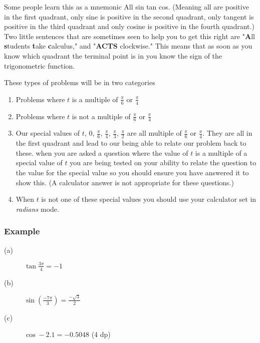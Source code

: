 Some people learn this as a mnemonic All sin tan cos. (Meaning all are positive in the first quadrant, only sine is positive in the second quadrant,
only tangent is positive in the third quadrant and only cosine is positive in the fourth quadrant.) Two little
sentences that are sometimes seen to help you to get this right are "\textbf{A}ll \textbf{s}tudents \textbf{t}ake \textbf{c}alculus," and
"\textbf{ACTS} clockwise." This means that as soon as you know which quadrant the terminal point is in you know the sign of the trigonometric function.


These types of problems will be in two categories 


\begin{enumerate}
	\item Problems where $t$ is a multiple of $\frac{\pi }{6}$ or $\frac{\pi }{4}$ 
	
	\item Problems where $t$ is not a multiple of $\frac{\pi }{6}$ or $\frac{\pi }{4}$ 
	
	\item Our special values of $t$, $0$, $\frac{\pi }{6}$, $\frac{\pi }{4}$, $\frac{\pi }{3}$, $\frac{\pi }{2}$ are all multiple of $\frac{\pi }{6}$ or $\frac{\pi }{4}$. They are all in the first quadrant and lead to our being able to relate our problem back
	to these. when you are asked a question where the value of $t$ is a multiple of a special value of $t$ you are being tested on your ability to relate the question to the value for the special value so you should ensure you have
	answered it to show this. (A calculator answer is not appropriate for these questions.) 
	
	\item When
	$t$ is not one of these special values you should use your calculator set in \emph{radians} mode. \end{enumerate}


\subsubsection{Example}
\begin{description}
	\item [(a)] $\tan  \frac{3 \pi }{4} = -1$ 
	
	\item [(b)] $\sin  \genfrac{(}{)}{}{}{ -7 \pi }{3} =\frac{ -\sqrt{3}}{2}$ 
	
	\item [(c)] $\cos  -2.1 = -0.5048$ (4 dp) \end{description}


